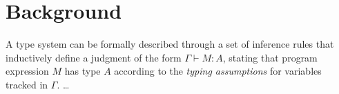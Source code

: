 \documentclass{llncs}
\begin{document}

\section{Background}

A type system can be formally described through a set of inference
rules that inductively define a judgment of the form $\Gamma \vdash M
: A$, stating that program expression $M$ has type $A$ according to
the \emph{typing assumptions} for variables tracked in $\Gamma$.
\dots

\end{document}
